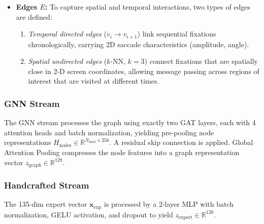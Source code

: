 \begin{itemize}
    \item \textbf{Edges $E$:} To capture spatial and temporal interactions, two types of edges are defined:
        \begin{enumerate}
            \item \textit{Temporal directed edges} ($v_i{\to}v_{i+1}$) link sequential fixations chronologically, carrying 2D saccade characteristics (amplitude, angle).
            \item \textit{Spatial undirected edges} ($k$-NN, $k{=}3$) connect fixations that are spatially close in 2-D screen coordinates, allowing message passing across regions of interest that are visited at different times.
        \end{enumerate}
\end{itemize}
 
\subsubsection{GNN Stream}
The GNN stream processes the graph using exactly two GAT layers, each with 4 attention heads and batch normalization, yielding pre-pooling node representations $H_\text{nodes} \in \mathbb{R}^{N_\text{max} \times 256}$. A residual skip connection is applied.  Global Attention Pooling \cite{velickovic2018} compresses the node features into a graph representation vector $z_\text{graph} \in \mathbb{R}^{128}$.
 
\subsubsection{Handcrafted Stream}
The 135-dim expert vector $\mathbf{x}_\text{exp}$ is processed by a 2-layer MLP with batch normalization, GELU activation, and dropout to yield $z_\text{expert} \in \mathbb{R}^{128}$.
 
